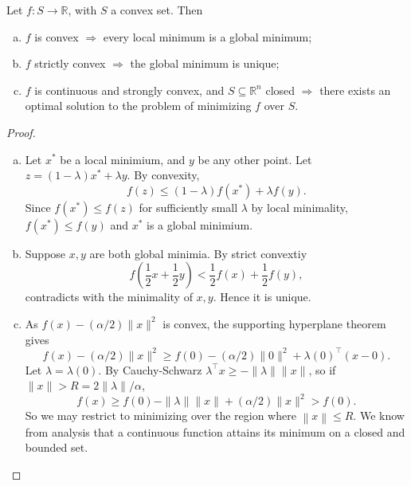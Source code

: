 \begin{theorem}
    Let $f: S \rightarrow \mathbb{R}$, with $S$ a convex set. Then 
    \begin{enumerate}[(a)]
        \item $f$ is convex $\Longrightarrow$ every local minimum is a global minimum;
        \item $f$ strictly convex $\Longrightarrow$ the global minimum is unique;
        \item $f$ is continuous and strongly convex, and $S \subseteq \mathbb{R}^n$ closed $\Longrightarrow$ there exists an optimal solution to the problem of minimizing $f$ over $S$.
    \end{enumerate}
\end{theorem}
\begin{proof}
    \begin{enumerate}[(a)]
        \item Let $x^*$ be a local minimium, and $y$ be any other point. Let $z = (1-\lambda)x^*+\lambda y$. By convexity,
        \[
            f(z) \le (1-\lambda) f(x^*) + \lambda f(y).
        \]
        Since $ f(x^*)\le f(z) $ for sufficiently small $\lambda$ by local minimality, $ f(x^*)\le f(y) $ and $x^*$ is a global minimium. 
        \item Suppose $x,y$ are both global minimia. By strict convextiy 
        \[
            f\left( \frac{1}{2}x+\frac{1}{2}y \right) < \frac{1}{2}f(x) + \frac{1}{2} f(y),
        \]
        contradicts with the minimality of $x,y$. Hence it is unique. 
        \item As $f(x)-(\alpha / 2)\|x\|^2$ is convex, the supporting hyperplane theorem gives
        \[
        f(x)-(\alpha / 2)\|x\|^2 \geq f(0)-(\alpha / 2)\|0\|^2+\lambda(0)^{\top}(x-0) .
        \]
        Let $\lambda=\lambda(0) .$ By Cauchy-Schwarz $\lambda^{\top} x \geq-\|\lambda\|\|x\|$, so if $\|x\|>R=2\|\lambda\| / \alpha$,
        \[
        f(x) \geq f(0)-\|\lambda\|\|x\|+(\alpha / 2)\|x\|^2>f(0).
        \]
        So we may restrict to minimizing over the region where $\left\| x \right\| \le R$. We know from analysis that a continuous function attains its minimum on a closed and bounded set.
    \end{enumerate}
\end{proof}

